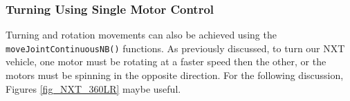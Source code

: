 \documentclass[11pt]{article}
\begin{document}

\subsubsection{Turning Using Single Motor Control}
Turning and rotation movements can also be achieved using the \verb+moveJointContinuousNB()+ 
functions. As previously discussed, to turn our NXT vehicle, one motor must be rotating at a 
faster speed then the other, or the motors must be spinning in the opposite direction. For 
the following discussion, Figures \ref{fig_NXT_360LR} maybe useful.\\
\end{document}
